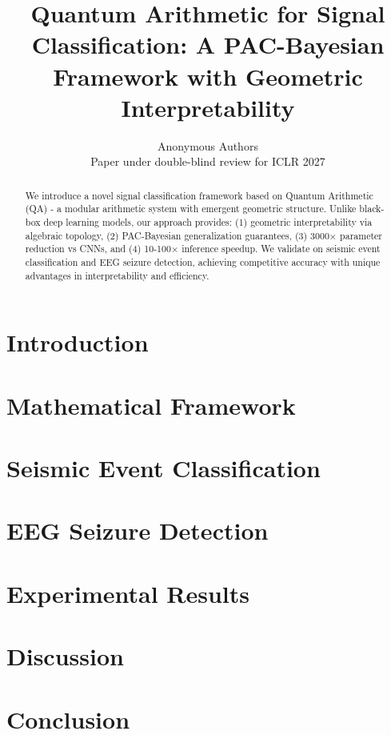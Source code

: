 \documentclass{article}
\title{Quantum Arithmetic for Signal Classification: A PAC-Bayesian Framework with Geometric Interpretability}
\author{
  Anonymous Authors \\
  Paper under double-blind review for ICLR 2027
}
\begin{document}
\maketitle

\begin{abstract}
We introduce a novel signal classification framework based on Quantum Arithmetic (QA) - a modular arithmetic system with emergent geometric structure. Unlike black-box deep learning models, our approach provides: (1) geometric interpretability via algebraic topology, (2) PAC-Bayesian generalization guarantees, (3) 3000× parameter reduction vs CNNs, and (4) 10-100× inference speedup. We validate on seismic event classification and EEG seizure detection, achieving competitive accuracy with unique advantages in interpretability and efficiency.
\end{abstract}

\section{Introduction}

\section{Mathematical Framework}

\section{Seismic Event Classification}

\section{EEG Seizure Detection}

\section{Experimental Results}

\section{Discussion}

\section{Conclusion}



\end{document}
